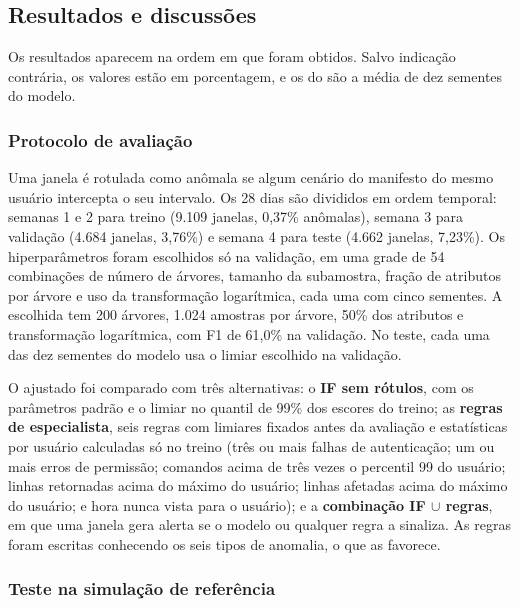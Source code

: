 \subsection{Resultados e discussões}
\label{sec:resultados-e-discussoes}

Os resultados aparecem na ordem em que foram obtidos. Salvo indicação contrária, os valores
estão em porcentagem, e os do \iforest{} são a média de dez sementes do modelo.

\subsubsection{Protocolo de avaliação}

Uma janela é rotulada como anômala se algum cenário do manifesto do mesmo usuário intercepta o
seu intervalo. Os 28 dias são divididos em ordem temporal: semanas 1 e 2 para treino (9.109
janelas, 0,37\% anômalas), semana 3 para validação (4.684 janelas, 3,76\%) e semana 4 para teste
(4.662 janelas, 7,23\%). Os hiperparâmetros foram escolhidos só na validação, em uma grade de 54
combinações de número de árvores, tamanho da subamostra, fração de atributos por árvore e uso da
transformação logarítmica, cada uma com cinco sementes. A escolhida tem 200 árvores, 1.024
amostras por árvore, 50\% dos atributos e transformação logarítmica, com F1 de 61,0\% na
validação. No teste, cada uma das dez sementes do modelo usa o limiar escolhido na validação.

O \iforest{} ajustado foi comparado com três alternativas: o \textbf{IF sem rótulos}, com os
parâmetros padrão e o limiar no quantil de 99\% dos escores do treino; as \textbf{regras de
especialista}, seis regras com limiares fixados antes da avaliação e estatísticas por usuário
calculadas só no treino (três ou mais falhas de autenticação; um ou mais erros de permissão;
comandos acima de três vezes o percentil 99 do usuário; linhas retornadas acima do máximo do
usuário; linhas afetadas acima do máximo do usuário; e hora nunca vista para o usuário); e a
\textbf{combinação IF $\cup$ regras}, em que uma janela gera alerta se o modelo ou qualquer regra
a sinaliza. As regras foram escritas conhecendo os seis tipos de anomalia, o que as favorece.

\subsubsection{Teste na simulação de referência}

